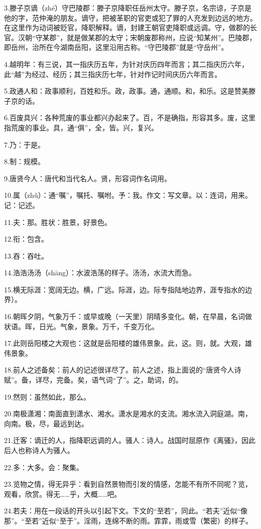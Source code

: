 \documentclass[letterpaper,10pt,english]{sphinxmanual}
\begin{document}
3.滕子京谪（zhé）守巴陵郡：滕子京降职任岳州太守。滕子京，名宗谅，子京是他的字，范仲淹的朋友。谪守，把被革职的官吏或犯了罪的人充发到边远的地方。在这里作为动词被贬官，降职解释。谪，封建王朝官吏降职或远调。守，做郡的长官。汉朝“守某郡”，就是做某郡的太守；宋朝废郡称州，应说“知某州”。巴陵郡，即岳州，治所在今湖南岳阳，这里沿用古称。“守巴陵郡”就是“守岳州”。

4.越明年：有三说，其一指庆历五年，为针对庆历四年而言；其二指庆历六年，此“越”为经过、经历；其三指庆历七年，针对作记时间庆历六年而言。

5.政通人和：政事顺利，百姓和乐。政，政事。通，通顺。和，和乐。这是赞美滕子京的话。

6.百废具兴：各种荒废的事业都兴办起来了。百，不是确指，形容其多。废，这里指荒废的事业。具，通“俱”，全，皆。兴，复兴。

7.乃：于是。

8.制：规模。

9.唐贤今人：唐代和当代名人。贤，形容词作名词用。

10.属（zhǔ）：通“嘱”，嘱托、嘱咐。予：我。作文：写文章。以：连词，用来。记：记述。

11.夫：那。胜状：胜景，好景色。

12.衔：包含。

13.吞：吞吐。

14.浩浩汤汤（shāng）：水波浩荡的样子。汤汤，水流大而急。

15.横无际涯：宽阔无边。横，广远。际涯，边。际专指陆地边界，涯专指水的边界）。

16.朝晖夕阴，气象万千：或早或晚（一天里）阴晴多变化。朝，在早晨，名词做状语。晖，日光。气象，景象。万千，千变万化。

17.此则岳阳楼之大观也：这就是岳阳楼的雄伟景象。此，这。则，就。大观，雄伟景象。

18.前人之述备矣：前人的记述很详尽了。前人之述，指上面说的“唐贤今人诗赋”。备，详尽，完备。矣，语气词“了”。之，助词，的。

19.然则：虽然如此，那么。

20.南极潇湘：南面直到潇水、湘水。潇水是湘水的支流。湘水流入洞庭湖。南，向南。极，尽，最远到达。

21.迁客：谪迁的人，指降职远调的人。骚人：诗人。战国时屈原作《离骚》，因此后人也称诗人为骚人。

22.多：大多。会：聚集。

23.览物之情，得无异乎：看到自然景物而引发的情感，怎能不有所不同呢？览，观看，欣赏。得无……乎，大概……吧。

24.若夫：用在一段话的开头以引起下文。下文的“至若”，同此。“若夫”近似“像那”。“至若”近似“至于”。淫雨，连绵不断的雨。霏霏，雨或雪（繁密）的样子。
\end{document}
